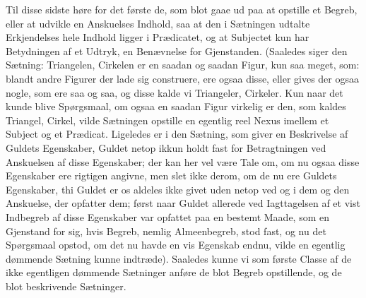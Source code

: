 \documentclass[12pt]{book}
\def\textit#1{#1}%
\newcommand{\opage}[1]{\marginnote{\footnotesize\textit{[#1]}}}
\begin{document}
Til disse sidste høre for det første de, som blot gaae ud paa at opstille et
Begreb, eller at udvikle en Anskuelses Indhold, saa at den i Sætningen udtalte
Erkjendelses hele Indhold ligger i Prædicatet, og at Subjectet kun har
Betydningen af et Udtryk, en Benævnelse for Gjenstanden. (Saaledes siger den
Sætning: Triangelen, Cirkelen er en saadan og saadan Figur, kun saa meget, som:
blandt andre Figurer der lade sig construere, ere ogsaa disse, eller gives der
ogsaa nogle, som ere saa og saa, og disse kalde vi Triangeler, Cirkeler. Kun
naar det kunde blive Spørgsmaal, om ogsaa en saadan Figur virkelig er den, som
kaldes Triangel, Cirkel, vilde Sætningen opstille en egentlig reel Nexus imellem
et Subject og et Prædicat. Ligeledes er i den Sætning, som giver en Beskrivelse
af Guldets Egenskaber, Guldet netop ikkun holdt fast for Betragtningen ved
Anskuelsen af disse Egenskaber; der kan her vel være Tale om, om nu ogsaa disse
Egenskaber ere rigtigen angivne, men slet ikke derom, om de nu ere Guldets
Egenskaber, thi Guldet er os aldeles ikke givet uden netop ved og i dem og den
Anskuelse, der opfatter dem; først naar Guldet allerede ved Iagttagelsen af et
vist Indbegreb af disse Egenskaber var opfattet paa en bestemt Maade, som en
Gjenstand for sig, hvis Begreb, nemlig Almeenbegreb, stod fast, og nu det
Spørgsmaal opstod, om det nu havde en vis Egenskab endnu,
\opage{302} vilde en egentlig dømmende Sætning kunne indtræde). Saaledes kunne vi som første
Classe af de ikke egentligen dømmende Sætninger anføre de blot Begreb
opstillende, og de blot beskrivende Sætninger.
\end{document}
